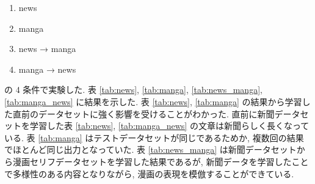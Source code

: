 \documentclass[onecolumn]{ujarticle}   %
\begin{document}
\begin{enumerate}
  \item news
  \item manga
  \item news → manga
  \item manga → news
\end{enumerate}

の 4 条件で実験した.
表 \ref{tab:news}, \ref{tab:manga}, \ref{tab:news_manga}, \ref{tab:manga_news} に結果を示した.
表 \ref{tab:news}, \ref{tab:manga} の結果から学習した直前のデータセットに強く影響を受けることがわかった. 直前に新聞データセットを学習した表 \ref{tab:news}, \ref{tab:manga_news} の文章は新聞らしく長くなっている.
表 \ref{tab:manga} はテストデータセットが同じであるためか, 複数回の結果でほとんど同じ出力となっていた.
表 \ref{tab:news_manga} は新聞データセットから漫画セリフデータセットを学習した結果であるが, 新聞データを学習したことで多様性のある内容となりながら, 漫画の表現を模倣することができている.
\end{document}
